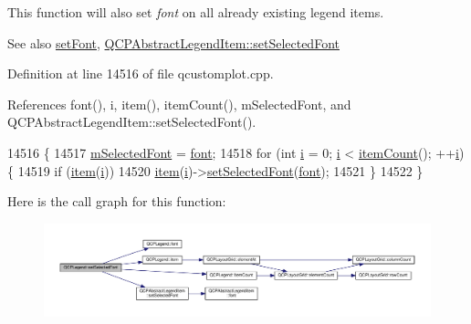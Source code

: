 This function will also set {\itshape font} on all already existing legend items.

\begin{DoxySeeAlso}{See also}
\hyperlink{class_q_c_p_legend_aa4cda8499e3cb0f3be415edc02984c73}{set\+Font}, \hyperlink{class_q_c_p_abstract_legend_item_a91db5aee48617a9d3206e61376807365}{Q\+C\+P\+Abstract\+Legend\+Item\+::set\+Selected\+Font} 
\end{DoxySeeAlso}


Definition at line 14516 of file qcustomplot.\+cpp.



References font(), i, item(), item\+Count(), m\+Selected\+Font, and Q\+C\+P\+Abstract\+Legend\+Item\+::set\+Selected\+Font().


\begin{DoxyCode}
14516                                                  \{
14517   \hyperlink{class_q_c_p_legend_a86ce8f6c20a2f51a48eaf3c24ce16805}{mSelectedFont} = \hyperlink{class_q_c_p_legend_a5cf8b840bc02f7bf4edb8dde400d0f41}{font};
14518   \textcolor{keywordflow}{for} (\textcolor{keywordtype}{int} \hyperlink{_comparision_pictures_2_createtest_image_8m_a6f6ccfcf58b31cb6412107d9d5281426}{i} = 0; \hyperlink{_comparision_pictures_2_createtest_image_8m_a6f6ccfcf58b31cb6412107d9d5281426}{i} < \hyperlink{class_q_c_p_legend_a198228e9cdc78d3a3c306fa6763d0404}{itemCount}(); ++\hyperlink{_comparision_pictures_2_createtest_image_8m_a6f6ccfcf58b31cb6412107d9d5281426}{i}) \{
14519     \textcolor{keywordflow}{if} (\hyperlink{class_q_c_p_legend_a454272d7094437beb3278a2294006da5}{item}(\hyperlink{_comparision_pictures_2_createtest_image_8m_a6f6ccfcf58b31cb6412107d9d5281426}{i}))
14520       \hyperlink{class_q_c_p_legend_a454272d7094437beb3278a2294006da5}{item}(\hyperlink{_comparision_pictures_2_createtest_image_8m_a6f6ccfcf58b31cb6412107d9d5281426}{i})->\hyperlink{class_q_c_p_abstract_legend_item_a91db5aee48617a9d3206e61376807365}{setSelectedFont}(\hyperlink{class_q_c_p_legend_a5cf8b840bc02f7bf4edb8dde400d0f41}{font});
14521   \}
14522 \}
\end{DoxyCode}


Here is the call graph for this function\+:\nopagebreak
\begin{figure}[H]
\begin{center}
\leavevmode
\includegraphics[width=350pt]{class_q_c_p_legend_ab580a01c3c0a239374ed66c29edf5ad2_cgraph}
\end{center}
\end{figure}


